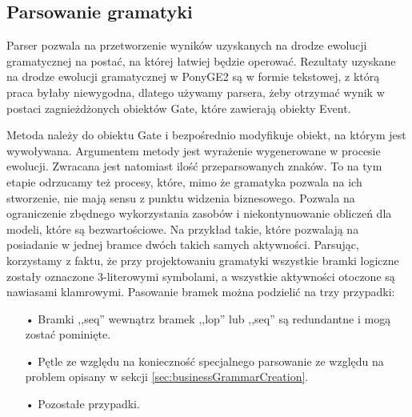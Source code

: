\subsection{Parsowanie gramatyki}
Parser pozwala na przetworzenie wyników uzyskanych na drodze ewolucji gramatycznej na postać, na której łatwiej będzie operować. Rezultaty uzyskane na drodze ewolucji gramatycznej w PonyGE2 są w formie tekstowej, z którą praca byłaby niewygodna, dlatego używamy parsera, żeby otrzymać wynik w postaci zagnieżdżonych obiektów Gate, które zawierają obiekty Event.

Metoda należy do obiektu Gate i bezpośrednio modyfikuje obiekt, na którym jest wywoływana. Argumentem metody jest wyrażenie wygenerowane w procesie ewolucji. Zwracana jest natomiast ilość przeparsowanych znaków. To na tym etapie odrzucamy też procesy, które, mimo że gramatyka pozwala na ich stworzenie, nie mają sensu z punktu widzenia biznesowego. Pozwala na ograniczenie zbędnego wykorzystania zasobów i niekontynuowanie obliczeń dla modeli, które są bezwartościowe. Na przykład takie, które pozwalają na posiadanie w jednej bramce dwóch takich samych aktywności. Parsując, korzystamy z faktu, że przy projektowaniu gramatyki wszystkie bramki logiczne zostały oznaczone 3-literowymi symbolami, a wszystkie aktywności otoczone są nawiasami klamrowymi. Pasowanie bramek można podzielić na trzy przypadki:
\begin{itemize}   
  \item[•] Bramki ,,seq'' wewnątrz bramek ,,lop'' lub ,,seq'' są redundantne i mogą zostać pominięte.
  \item[•] Pętle ze względu na konieczność specjalnego parsowanie ze względu na problem opisany w sekcji \ref{sec:businessGrammarCreation}.
  \item[•] Pozostałe przypadki.
\end{itemize}


